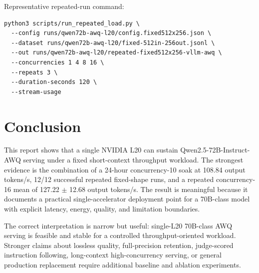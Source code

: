 \documentclass[11pt]{article}
\newcommand{\qwenawq}{Qwen2.5\nobreakdash-72B\nobreakdash-Instruct\nobreakdash-AWQ}
\begin{document}
Representative repeated-run command:

\begin{verbatim}
python3 scripts/run_repeated_load.py \
  --config runs/qwen72b-awq-l20/config.fixed512x256.json \
  --dataset runs/qwen72b-awq-l20/fixed-512in-256out.jsonl \
  --out runs/qwen72b-awq-l20/repeated-fixed512x256-vllm-awq \
  --concurrencies 1 4 8 16 \
  --repeats 3 \
  --duration-seconds 120 \
  --stream-usage
\end{verbatim}

\section{Conclusion}

This report shows that a single NVIDIA L20 can sustain \qwenawq{}
serving under a fixed short-context throughput workload. The strongest evidence
is the combination of a 24-hour concurrency-10 soak at 108.84 output tokens/s,
12/12 successful repeated fixed-shape runs, and a repeated concurrency-16 mean
of 127.22 $\pm$ 12.68 output tokens/s. The result is meaningful because it
documents a practical single-accelerator deployment point for a 70B-class model
with explicit latency, energy, quality, and limitation boundaries.

The correct interpretation is narrow but useful: single-L20 70B-class AWQ
serving is feasible and stable for a controlled throughput-oriented workload.
Stronger
claims about lossless quality, full-precision retention, judge-scored
instruction following, long-context high-concurrency serving, or general
production replacement require additional baseline and ablation experiments.



\end{document}
